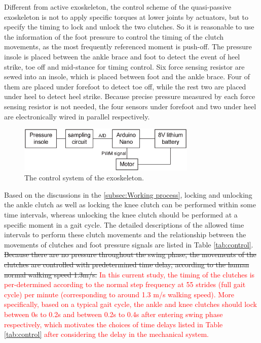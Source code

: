 \documentclass[twocolumn,cleanfoot,10pt]{asme2ej}
\begin{document}
Different from active exoskeleton, the control scheme of the quasi-passive exoskeleton is not to apply specific torques at lower joints by actuators, but to specify the timing to lock and unlock the two clutches. So it is reasonable to use the information of the foot pressure to control the timing of the clutch movements, as the most frequently referenced moment is push-off. The pressure insole is placed between the ankle brace and foot to detect the event of heel strike, toe off and mid-stance for timing control. Six force sensing resistor are sewed into an insole, which is placed between foot and the ankle brace. Four of them are placed under forefoot to detect toe off, while the rest two are placed under heel to detect heel strike. Because precise pressure measured by each force sensing resistor is not needed, the four sensors under forefoot and two under heel are electronically wired in parallel respectively. 

\begin{figure}[t]
	\centering
	\includegraphics[width=8.5cm]{control.eps}
	\caption{The control system of the exoskeleton.}
	\label{fig:control}   
\end{figure}

Based on the discussions in the \ref{subsec:Working process}, locking and unlocking the ankle clutch as well as locking the knee clutch can be performed within some time intervals, whereas unlocking the knee clutch should be performed at a specific moment in a gait cycle. The detailed descriptions of the allowed time intervals to perform these clutch movements and the relationship between the movements of clutches and foot pressure signals are listed in Table \ref{tab:control}. \sout{Because there are no pressure throughout the swing phase, the movements of the clutches are controlled with predetermined time delay, according to the human normal walking speed 1.3m/s.} \textcolor{red}{In this current study, the timing of the clutches is per-determined according to the normal step frequency at 55 strides (full gait cycle) per minute (corresponding to around 1.3 m/s walking speed). More specifically, based on a typical gait cycle, the ankle and knee clutches should lock between 0s to 0.2s and between 0.2s to 0.4s after entering swing phase respectively, which motivates the choices of time delays listed in Table \ref{tab:control} after considering the delay in the mechanical system.}
\end{document}

